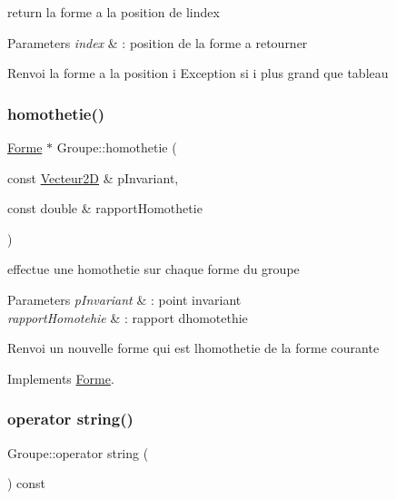 return la forme a la position de l\textquotesingle{}index 


\begin{DoxyParams}{Parameters}
{\em index} & \+: position de la forme a retourner\\
\hline
\end{DoxyParams}
Renvoi la forme a la position i Exception si i plus grand que tableau \mbox{\label{class_groupe_a88053e52f4144d3938aa2c656ddd6395}} 
\subsubsection{\texorpdfstring{homothetie()}{homothetie()}}
{\footnotesize\ttfamily \mbox{\hyperlink{class_forme}{Forme}} $\ast$ Groupe\+::homothetie (\begin{DoxyParamCaption}\item[{const \mbox{\hyperlink{class_vecteur2_d}{Vecteur2D}} \&}]{p\+Invariant,  }\item[{const double \&}]{rapport\+Homothetie }\end{DoxyParamCaption})\hspace{0.3cm}{\ttfamily [virtual]}}



effectue une homothetie sur chaque forme du groupe 


\begin{DoxyParams}{Parameters}
{\em p\+Invariant} & \+: point invariant \\
\hline
{\em rapport\+Homotehie} & \+: rapport d\textquotesingle{}homotethie\\
\hline
\end{DoxyParams}
Renvoi un nouvelle forme qui est l\textquotesingle{}homothetie de la forme courante 

Implements \mbox{\hyperlink{class_forme}{Forme}}.

\mbox{\label{class_groupe_ab8bcab328da985da9907cffe76ca71d0}} 
\subsubsection{\texorpdfstring{operator string()}{operator string()}}
{\footnotesize\ttfamily Groupe\+::operator string (\begin{DoxyParamCaption}{ }\end{DoxyParamCaption}) const\hspace{0.3cm}{\ttfamily [virtual]}}



